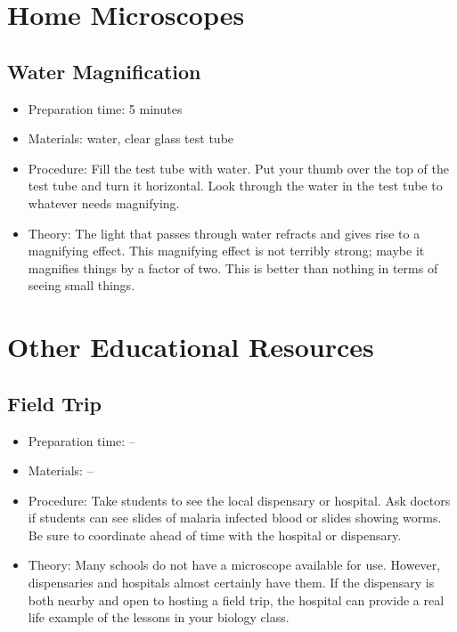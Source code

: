 \section{Home Microscopes}

\subsection{Water Magnification}
\begin{itemize}
\item{Preparation time: 5 minutes}
\item{Materials: water, clear glass test tube}
\item{Procedure: Fill the test tube with water. Put your thumb over the top of the test tube and turn it horizontal. Look through the water in the test tube to whatever needs magnifying.}
\item{Theory: The light that passes through water refracts and gives rise to a magnifying effect. This magnifying effect is not terribly strong; maybe it magnifies things by a factor of two. This is better than nothing in terms of seeing small things.}
\end{itemize}

\section{Other Educational Resources}

\subsection{Field Trip}
\begin{itemize}
\item{Preparation time: --}
\item{Materials: --}
\item{Procedure: Take students to see the local dispensary or hospital. Ask doctors if students can see slides of malaria infected blood or slides showing worms. Be sure to coordinate ahead of time with the hospital or dispensary.}
\item{Theory: Many schools do not have a microscope available for use. However, dispensaries and hospitals almost certainly have them. If the dispensary is both nearby and open to hosting a field trip, the hospital can provide a real life example of the lessons in your biology class.}
\end{itemize}

